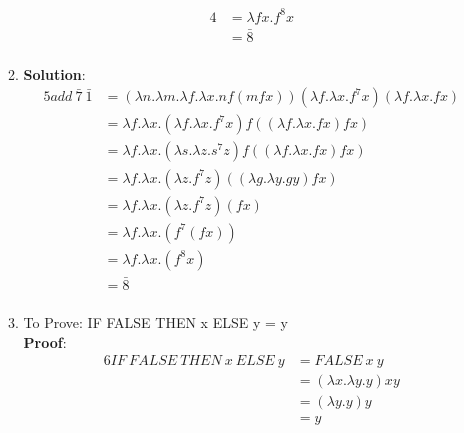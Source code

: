 \documentclass[11pt]{article}
\begin{document}
\begin{enumerate}
\begin{enumerate}
\begin{alignat*}{4}
&= \lambda fx.  f^8 x\\
&= \bar{8}\\
            \end{alignat*} 
    \item 
          \textbf{Solution}:  \begin{alignat*}{5}
                add\:\bar{7}\:\bar{1}  &= (\lambda n.\lambda m.\lambda f.\lambda x. n f (m f x))(\lambda f.\lambda x. f^7 x)(\lambda f.\lambda x. f x)\\
              &= \lambda f.\lambda x. (\lambda f.\lambda x. f^7 x) f ((\lambda f.\lambda x. f x)f x)\\
            &= \lambda f.\lambda x. (\lambda s.\lambda z. s^7 z) f ((\lambda f.\lambda x. f x)f x)\\
            &= \lambda f.\lambda x. (\lambda z. f^7 z)((\lambda g.\lambda y. g y)f x)\\
            &= \lambda f.\lambda x. (\lambda z. f^7 z)(f x)\\
            &= \lambda f.\lambda x. ( f^7 (f x))\\
            &= \lambda f.\lambda x. ( f^8 x)\\
                    &= \bar{8}\\
            \end{alignat*}
            
    \item To Prove: IF FALSE THEN x ELSE y = y\\
    \textbf{Proof}:  \begin{alignat*}{6}
    IF\:FALSE\:THEN\:x\:ELSE\:y &= FALSE\:x\:y  \\
    &= (\lambda x. \lambda y. y) x y\\
    &= ( \lambda y. y) y\\
    &= y\\
    \end{alignat*}
    

\end{enumerate}
\end{enumerate}
\end{document}
